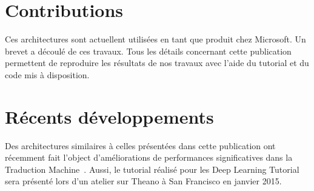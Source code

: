 \section{Contributions}

Ces architectures sont actuellent utilisées en tant que produit chez Microsoft.
Un brevet a découlé de ces travaux. Tous les détails concernant cette
publication permettent de reproduire les résultats de nos travaux avec l'aide
du tutorial et du code mis à disposition. 

\section{R\'{e}cents d\'{e}veloppements}

Des architectures similaires à celles présentées dans cette publication ont
récemment fait l'object d'améliorations de performances significatives dans la
Traduction Machine~\citep{Seq-14}. Aussi, le tutorial réalisé pour les Deep
Learning Tutorial sera présenté lors d'un atelier sur Theano à San Francisco en
janvier 2015.


